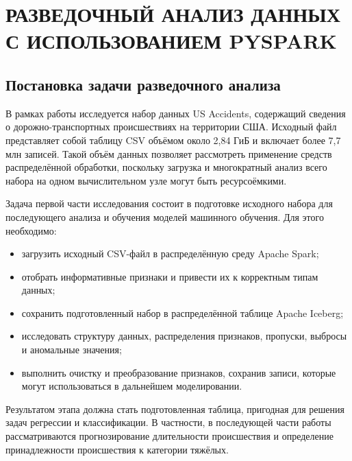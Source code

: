 \chapter{\MakeUppercase{Разведочный анализ данных с использованием PySpark}}\label{ch:first}
\let\code\relax
\let\endcode\relax
{}
\section{Постановка задачи разведочного анализа}\vspace{\baselineskip}

В рамках работы исследуется набор данных US Accidents, содержащий сведения о дорожно-транспортных происшествиях на территории США. Исходный файл представляет собой таблицу CSV объёмом около 2,84 ГиБ и включает более 7,7 млн записей. Такой объём данных позволяет рассмотреть применение средств распределённой обработки, поскольку загрузка и многократный анализ всего набора на одном вычислительном узле могут быть ресурсоёмкими.

Задача первой части исследования состоит в подготовке исходного набора для последующего анализа и обучения моделей машинного обучения. Для этого необходимо:
\begin{itemize}
    \item загрузить исходный CSV-файл в распределённую среду Apache Spark;
    \item отобрать информативные признаки и привести их к корректным типам данных;
    \item сохранить подготовленный набор в распределённой таблице Apache Iceberg;
    \item исследовать структуру данных, распределения признаков, пропуски, выбросы и аномальные значения;
    \item выполнить очистку и преобразование признаков, сохранив записи, которые могут использоваться в дальнейшем моделировании.
\end{itemize}

Результатом этапа должна стать подготовленная таблица, пригодная для решения задач регрессии и классификации. В частности, в последующей части работы рассматриваются прогнозирование длительности происшествия и определение принадлежности происшествия к категории тяжёлых.

